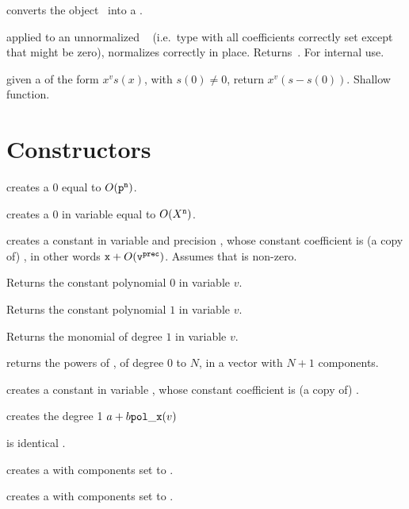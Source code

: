  converts the object~ into a
.

 applied to an unnormalized ~
(i.e.~type  with all coefficients correctly set except that 
might be zero), normalizes  correctly in place. Returns~.
For internal use.

 given a  of the form $x^v s(x)$, with
$s(0)\neq 0$, return $x^v(s - s(0))$. Shallow function.

\section{Constructors}

\label{se:clean}

 creates a $0$  equal to
$O({\tt p}^{\tt n})$.

 creates a $0$  in variable
 equal to $O(X^{\tt n})$.

 creates a constant 
in variable  and precision , whose constant coefficient is
(a copy of) , in other words ${\tt x} + O({\tt v}^{\tt prec})$.
Assumes that  is non-zero.

 Returns the constant polynomial $0$ in variable $v$.

 Returns the constant polynomial $1$ in variable $v$.

 Returns the monomial of degree $1$ in variable $v$.

 returns the powers of
, of degree $0$ to $N$, in a vector with $N+1$ components.

 creates a constant  in variable
, whose constant coefficient is (a copy of) .

 creates the degree 1 
$a + b {\tt pol\_x}(v)$

 is identical .

 creates a  with  components set to
.

 creates a  with  components set to
.


